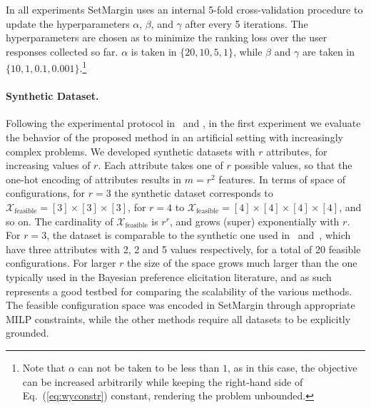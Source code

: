 \documentclass{article}
\renewcommand\[{\begin{equation}}
\renewcommand\]{\end{equation}}
\newcommand{\calvar}[1]{\ensuremath{\mathcal{#1}}}
\newcommand{\calX}{\calvar{X}}
\begin{document}
In all experiments {\sc SetMargin} uses an internal 5-fold cross-validation procedure to
update the hyperparameters $\alpha$, $\beta$, and $\gamma$ after every 5
iterations. The hyperparameters are chosen as to minimize the ranking loss over
the user responses collected so far. $\alpha$ is taken in $\{20, 10, 5, 1\}$,
while $\beta$ and $\gamma$ are taken in $\{10, 1, 0.1, 0.001\}$.\footnote{Note
that $\alpha$ can not be taken to be less than $1$, as in this case, the
objective can be increased arbitrarily while keeping the right-hand side of
Eq.~(\ref{eq:wyconstr}) constant, rendering the problem unbounded.}

\paragraph{Synthetic Dataset.} Following the experimental protocol
in~\cite{guo2010real} and \cite{viappiani2010optimal}, in the first
experiment we evaluate the behavior of the proposed method in an
artificial setting with increasingly complex problems. We developed
synthetic datasets with $r$ attributes, for increasing values of $r$.
Each attribute takes one of $r$ possible values, so that the one-hot
encoding of attributes results in $m=r^2$ features. In terms of space
of configurations, for $r=3$ the synthetic dataset corresponds to 
$\calX_\text{feasible} = [3] \times [3] \times [3]$, for $r=4$ to
$\calX_\text{feasible} = [4] \times [4] \times [4] \times [4]$, and so on. The
cardinality of $\calX_\text{feasible}$ is $r^r$, and grows (super)
exponentially with $r$.
For $r=3$, the dataset is comparable to the synthetic one used
in~\cite{guo2010real} and~\cite{viappiani2010optimal}, which have
three attributes with 2, 2 and 5 values respectively, for a total of
20 feasible configurations.  For larger $r$ the size of the space
grows much larger than the one typically used in the Bayesian
preference elicitation literature, and as such represents a good testbed
for comparing the scalability of the various methods. The feasible
configuration space was encoded in {\sc SetMargin} through appropriate
MILP constraints, while the other methods require all datasets to be
explicitly grounded.
\end{document}
